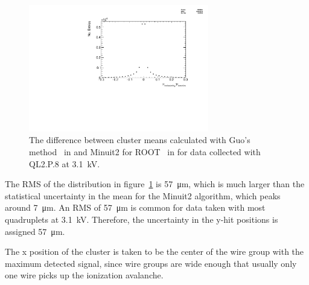 \begin{figure}
    \centering
    \includegraphics[width = 0.7\textwidth]{figures/figure_QL2P08_3100V_2021-05-21_reclustering_plots_mu_reclustering_minus_mu_cosmics.pdf}
    \caption{The difference between cluster means calculated with Guo's method~\cite{guo_simple_2011} in  and Minuit2 for ROOT~\cite{hatlo_developments_2005} in  for data collected with QL2.P.8 at 3.1~kV.}
    \label{fig:mu_reclustering_minus_mu_cosmics}
\end{figure}

The RMS of the distribution in figure~\ref{fig:mu_reclustering_minus_mu_cosmics} is \SI{57}{\micro\meter}, which is much larger than the statistical uncertainty in the mean for the Minuit2 algorithm, which peaks around \SI{7}{\micro\meter}. An RMS of \SI{57}{\micro\meter} is common for data taken with most quadruplets at 3.1~kV. Therefore, the uncertainty in the y-hit positions is assigned \SI{57}{\micro\meter}.


The x position of the cluster is taken to be the center of the wire group with the maximum detected signal, since wire groups are wide enough that usually only one wire picks up the ionization avalanche. 


